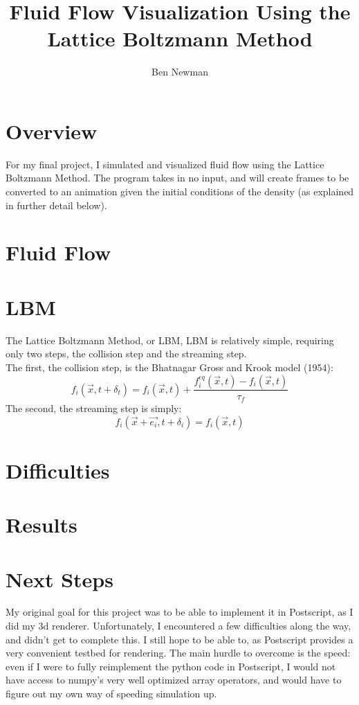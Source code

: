 \documentclass[12pt]{article}
\title{Fluid Flow Visualization Using the Lattice Boltzmann Method}
\author{Ben Newman}
\begin{document}
	\maketitle
	\newpage
	
	\section{Overview}
	For my  final project, I simulated and visualized fluid flow using the Lattice Boltzmann Method. The program takes  in no input, and will create frames to be converted to an animation given the initial conditions of the density (as explained in further detail below).
	\section{Fluid Flow}
	
	\section{LBM}
	The Lattice Boltzmann Method, or LBM, 
	LBM is relatively simple, requiring only two steps, the collision step and  the streaming step.\\
	The first, the collision step, is the Bhatnagar Gross and Krook model (1954):\\
	$$
	f_i(\overrightarrow{x},t+\delta_t)=f_i(\overrightarrow{x},t)+\frac{f_i^{eq}(\overrightarrow{x},t)-f_i(\overrightarrow{x},t)}{\tau_f}
	$$
	The second, the streaming step is simply:
	$$
	f_i(\overrightarrow{x}+\overrightarrow{e_i},t+\delta_i)=f_i(\overrightarrow{x},t)
	$$
	\section{Difficulties}
	
	\section{Results}
	
	\section{Next Steps}
	My original goal for this project was to be able to implement it in Postscript, as I did my 3d renderer. Unfortunately,  I encountered a few difficulties along the way, and didn't get to complete this. I still hope to be able to, as Postscript provides a very convenient testbed for rendering. The main hurdle to overcome is the speed: even if I were to fully reimplement the python code in Postscript, I would not have access to numpy's very well optimized array operators, and would have to figure out  my own way of speeding simulation up.
\end{document}
